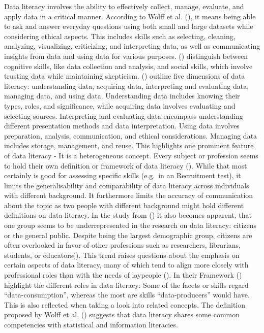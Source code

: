 \documentclass[
  12pt,
  a4paper,
  twoside]{article}
\begin{document}
Data literacy involves the ability to effectively collect, manage, evaluate, and apply data in a critical manner. According to Wolff et al. (), it means being able to ask and answer everyday questions using both small and large datasets while considering ethical aspects. This includes skills such as selecting, cleaning, analyzing, visualizing, criticizing, and interpreting data, as well as communicating insights from data and using data for various purposes. () distinguish between cognitive skills, like data collection and analysis, and social skills, which involve trusting data while maintaining skepticism. () outline five dimensions of data literacy: understanding data, acquiring data, interpreting and evaluating data, managing data, and using data. Understanding data includes knowing their types, roles, and significance, while acquiring data involves evaluating and selecting sources. Interpreting and evaluating data encompass understanding different presentation methods and data interpretation. Using data involves preparation, analysis, communication, and ethical considerations. Managing data includes storage, management, and reuse.
This highlights one prominent feature of data literacy - It is a heterogeneous concept. Every subject or profession seems to hold their own definition or framework of data literacy (). While that most certainly is good for assessing specific skills (e.g.~in an Recruitment test), it limits the generalisability and comparability of data literacy across individuals with different background. It furthermore limits the accuracy of communication about the topic as two people with different background might hold different definitions on data literacy. In the study from () it also becomes apparent, that one group seems to be underrepresented in the research on data literacy: citizens or the general public.
Despite being the largest demographic group, citizens are often overlooked in favor of other professions such as researchers, librarians, students, or educators(). This trend raises questions about the emphasis on certain aspects of data literacy, many of which tend to align more closely with professional roles than with the needs of laypeople ().
In their Framework () highlight the different roles in data literacy: Some of the facets or skills regard ``data-consumption'', whereas the most are skills ``data-producers'' would have. This is also reflected when taking a look into related concepts. The definition proposed by Wolff et al. () suggests that data literacy shares some common competencies with statistical and information literacies.
\end{document}
